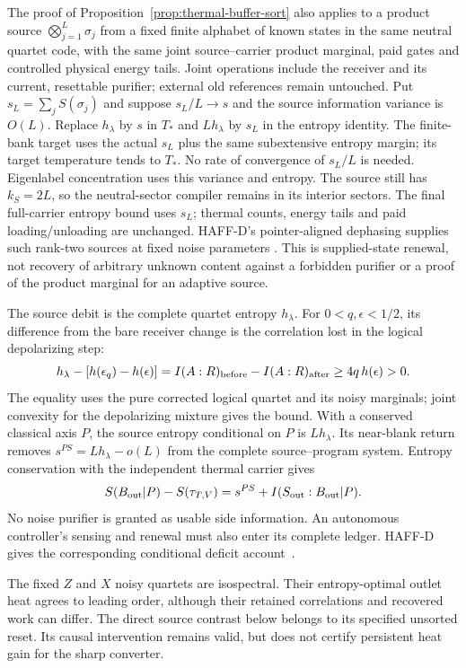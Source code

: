 \begin{remark}
The proof of Proposition~\ref{prop:thermal-buffer-sort} also applies
to a product source $\bigotimes_{j=1}^L\sigma_j$ from a fixed finite
alphabet of known states in the same neutral quartet code, with the
same joint source--carrier product marginal, paid gates and controlled
physical energy tails. Joint operations include the receiver and its
current, resettable purifier; external old references remain untouched.
Put $s_L=\sum_jS(\sigma_j)$ and suppose $s_L/L\to s$ and the
source information variance is $O(L)$. Replace $h_\lambda$ by $s$
in $T_*$ and $Lh_\lambda$ by $s_L$ in the entropy identity.
The finite-bank target uses the actual $s_L$ plus the same subextensive
entropy margin; its target temperature tends to $T_*$. No rate of
convergence of $s_L/L$ is needed.
Eigenlabel concentration uses this variance and entropy. The source
still has $k_S=2L$, so the neutral-sector compiler remains in its
interior sectors. The final full-carrier entropy bound uses $s_L$;
thermal counts, energy tails and paid loading/unloading are unchanged.
HAFF-D's pointer-aligned dephasing supplies such rank-two sources at
fixed noise parameters \cite{Liu2026HAFFD}. This is supplied-state
renewal, not recovery of arbitrary unknown content against a forbidden
purifier or a proof of the product marginal for an adaptive source.
\end{remark}

The source debit is the complete quartet entropy $h_\lambda$.
For $0<q,\epsilon<1/2$, its difference from the bare receiver change is the correlation
lost in the logical depolarizing step:
\[
 h_\lambda-[h(\epsilon_q)-h(\epsilon)]
 =I(A:R)_{\rm before}-I(A:R)_{\rm after}
 \ge4q\,h(\epsilon)>0.
\]
The equality uses the pure corrected logical quartet and its noisy
marginals; joint convexity for the depolarizing mixture gives the bound.
With a conserved classical axis $P$, the source entropy conditional
on $P$ is $Lh_\lambda$. Its near-blank return removes
$s^{PS}=Lh_\lambda-o(L)$ from the complete source--program system.
Entropy conservation with the independent thermal carrier gives
\[
 S(B_{\rm out}|P)-S(\tau_{T,V})
 =s^{PS}+I(S_{\rm out}:B_{\rm out}|P).
\]
No noise purifier is granted as usable side information. An autonomous
controller's sensing and renewal must also enter its complete ledger.
HAFF-D gives the corresponding conditional deficit account~\cite{Liu2026HAFFD}.

The fixed $Z$ and $X$ noisy quartets are isospectral. Their
entropy-optimal outlet heat agrees to leading order, although their
retained correlations and recovered work can differ. The direct source
contrast below belongs to its specified unsorted reset. Its causal
intervention remains valid, but does not certify persistent heat gain
for the sharp converter.

